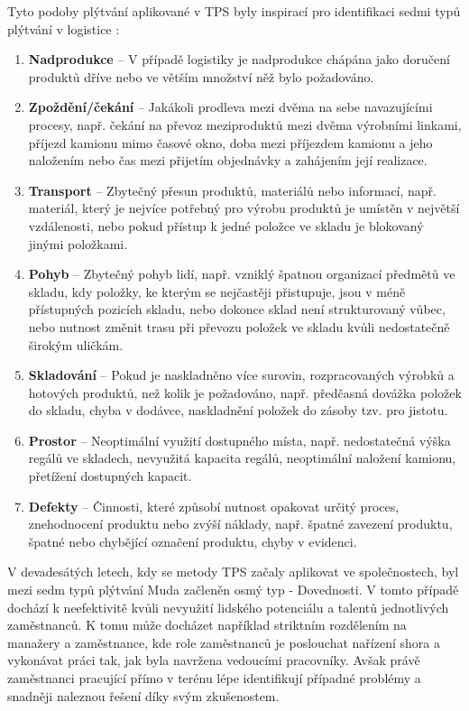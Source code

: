 Tyto podoby plýtvání aplikované v TPS byly inspirací pro identifikaci sedmi typů plýtvání v logistice \cite{bib:seven, bib:Jirsak}:
\begin{enumerate}
    \item \textbf{Nadprodukce} -- V případě logistiky je nadprodukce chápána jako doručení produktů dříve nebo ve větším množství něž bylo požadováno.
    \item \textbf{Zpoždění/čekání} -- Jakákoli prodleva mezi dvěma na sebe navazujícími procesy, např. čekání na převoz meziproduktů mezi dvěma výrobními linkami, příjezd kamionu mimo časové okno, doba mezi příjezdem kamionu a jeho naložením nebo čas mezi přijetím objednávky a zahájením její realizace. 
    \item \textbf{Transport} -- Zbytečný přesun produktů, materiálů nebo informací, např. materiál, který je nejvíce potřebný pro výrobu produktů je umístěn v největší vzdálenosti, nebo pokud přístup k jedné položce ve skladu je blokovaný jinými položkami.
    \item \textbf{Pohyb} -- Zbytečný pohyb lidí, např. vzniklý špatnou organizací předmětů ve skladu, kdy položky, ke kterým se nejčastěji přistupuje, jsou v méně přístupných pozicích skladu, nebo dokonce sklad není strukturovaný vůbec, nebo nutnost změnit trasu při převozu položek ve skladu kvůli nedostatečně širokým uličkám.
    \item \textbf{Skladování} -- Pokud je naskladněno více surovin, rozpracovaných výrobků a hotových produktů, než kolik je požadováno, např. předčasná dovážka položek do skladu, chyba v dodávce, naskladnění položek do zásoby tzv. pro jistotu.
    \item \textbf{Prostor} -- Neoptimální využití dostupného místa, např. nedostatečná výška regálů ve skladech, nevyužitá kapacita regálů, neoptimální naložení kamionu, přetížení dostupných kapacit.
    \item \textbf{Defekty} -- Činnosti, které způsobí nutnost opakovat určitý proces, znehodnocení produktu nebo zvýší náklady, např. špatné zavezení produktu, špatné nebo chybějící označení produktu, chyby v evidenci.
\end{enumerate}

V devadesátých letech, kdy se metody TPS začaly aplikovat ve společnostech, byl mezi sedm typů plýtvání Muda začleněn osmý typ - Dovednosti. V tomto případě dochází k neefektivitě kvůli nevyužití lidského potenciálu a talentů jednotlivých zaměstnanců. K tomu může docházet například striktním rozdělením na manažery a zaměstnance, kde role zaměstnanců je poslouchat nařízení shora a vykonávat práci tak, jak byla navržena vedoucími pracovníky. Avšak právě zaměstnanci pracující přímo v terénu lépe identifikují případné problémy a snadněji naleznou řešení díky svým zkušenostem.\cite{bib:LW1}


